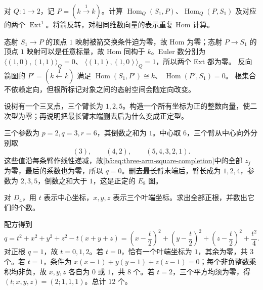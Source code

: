 \begin{optionalexercise}\label{b5:ex:10-hom-orientation}
	对 \(Q:1\to2\)，记 \(P=(k\xrightarrow{1}k)\)。计算 \(\operatorname{Hom}_Q(S_1,P)\)、\(\operatorname{Hom}_Q(P,S_1)\) 及对应的两个 \(\operatorname{Ext}^1\)。将箭反转，对相同维数向量的表示重复 Hom 计算。
\end{optionalexercise}
\begin{solution}
	态射 \(S_1\to P\) 的顶点 \(1\) 映射被箭交换条件迫为零，故 Hom 为零；态射 \(P\to S_1\) 的顶点 \(1\) 映射可以是任意标量，故 Hom 同构于 \(k\)。Euler 数分别为 \(\bigl\langle(1,0),(1,1)\bigr\rangle_Q=0\)、 \(\bigl\langle(1,1),(1,0)\bigr\rangle_Q=1\)，所以两个 Ext 都为零。 反向箭图的 \(P'=(k\xleftarrow{1}k)\) 满足 \(\operatorname{Hom}(S_1,P')\cong k\)、 \(\operatorname{Hom}(P',S_1)=0\)。 根集合不依赖定向，但根所标记对象之间的态射空间会随定向改变。
\end{solution}

\begin{optionalexercise}\label{b5:ex:10-affine-three-arm}
	设树有一个三叉点，三个臂长为 \(1,2,5\)。构造一个所有坐标为正的整数向量，使二次型为零；再说明把最长臂末端删去后为什么变成正定型。
\end{optionalexercise}
\begin{solution}
	三个参数为 \(p=2,q=3,r=6\)，其倒数之和为 \(1\)。中心取 \(6\)，三个臂从中心向外分别取
	\[
		(3),\qquad(4,2),\qquad(5,4,3,2,1).
	\]
	这些值沿每条臂作线性递减，故\eqref{b5:eq:three-arm-square-completion}中的全部 \(z_j\) 为零，最后的系数也为零，所以 \(q=0\)。删去最长臂末端后，臂长成为 \(1,2,4\)，参数为 \(2,3,5\)，倒数之和大于 \(1\)，这是正定的 \(E_8\) 图。
\end{solution}

\begin{optionalexercise}\label{b5:ex:10-d4-roots}
	对 \(D_4\)，用 \(t\) 表示中心坐标，\(x,y,z\) 表示三个叶端坐标。求出全部正根，并数出它们的个数。
\end{optionalexercise}
\begin{solution}
	配方得到
	\[
		q=t^2+x^2+y^2+z^2-t(x+y+z) =\left(x-\frac t2\right)^2+ \left(y-\frac t2\right)^2+ \left(z-\frac t2\right)^2+\frac{t^2}{4}.
	\]
	对正根 \(q=1\)，故 \(t=0,1,2\)。若 \(t=0\)，恰有一个叶端坐标为 \(1\)，其余为零，共 \(3\) 个。若 \(t=1\)，条件为 \(x(x-1)+y(y-1)+z(z-1)=0\)；每个非负整数乘积均非负，故 \(x,y,z\) 各自为 \(0\) 或 \(1\)，共 \(8\) 个。若 \(t=2\)，三个平方均须为零，得 \((t;x,y,z)=(2;1,1,1)\)。总计 \(12\) 个。
\end{solution}

